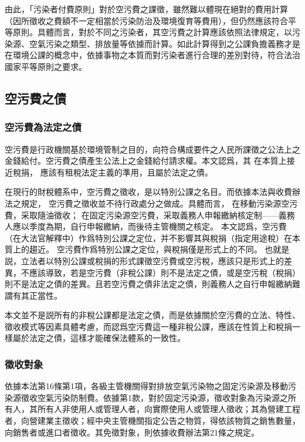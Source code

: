 由此，「污染者付費原則」對於空污費之課徵，雖然難以體現在絕對的費用計算（因所徵收之費額不一定相當於污染防治及環境復育等費用），但仍然應該符合平等原則。具體而言，對於不同之污染者，其空污費之計算應該依照法律規定，以污染源、空氣污染之類型、排放量等依據而計算。如此計算得到之公課負擔義務才是在環境公課的概念中，依據事物之本質而對污染者進行合理的差別對待，符合法治國家平等原則之要求。

\subsection{空污費之債}

\subsubsection{空污費為法定之債}

空污費是行政機關基於環境管制之目的，向符合構成要件之人民所課徵之公法上之金錢給付。空污費之債產生公法上之金錢給付請求權。本文認爲，其
在本質上接近稅捐，
應該有租稅法定主義的準用，且屬於法定之債。


在現行的財稅體系中，空污費之徵收，是以特別公課之名目。而依據本法與收費辦法之規定，
空污費之徵收並不待行政處分之做成。具體而言，
在移動污染源空污費，采取隨油徵收；
在固定污染源空污費，采取義務人申報繳納核定制——義務人應以季度為期，自行申報繳納，而後待主管機關之核定。
本文認爲，空污費（在大法官解釋中）作爲特別公課之定位，并不影響其與稅捐（指定用途稅）在本質上的趨近。
空污費作爲特別公課之定位，與稅捐僅是形式上的不同。
也就是説，立法者以特別公課或稅捐的形式課徵空污費或空污稅，應該只是形式上的差異，不應該導致，若是空污費（非稅公課）則不是法定之債，或是空污稅（稅捐）則不是法定之債的差異。且若空污費之債非法定之債，則義務人之自行申報繳納難謂有其正當性。

本文並不是説所有的非稅公課都是法定之債，而是依據關於空污費的立法、特性、徵收模式等因素具體考慮，而認爲空污費這一種非稅公課，應該在性質上和稅捐一樣屬於法定之債，這樣才能確保法體系的一致性。


\subsubsection{徵收對象}

依據本法第16條第1項，各級主管機關得對排放空氣污染物之固定污染源及移動污染源徵收空氣污染防制費。依據第1款，對於固定污染源，徵收對象為污染源之所有人，其所有人非使用人或管理人者，向實際使用人或管理人徵收；其為營建工程者，向營建業主徵收；經中央主管機關指定公告之物質，得依該物質之銷售數量，向銷售者或進口者徵收。其免徵對象，則依據收費辦法第21條之規定。

